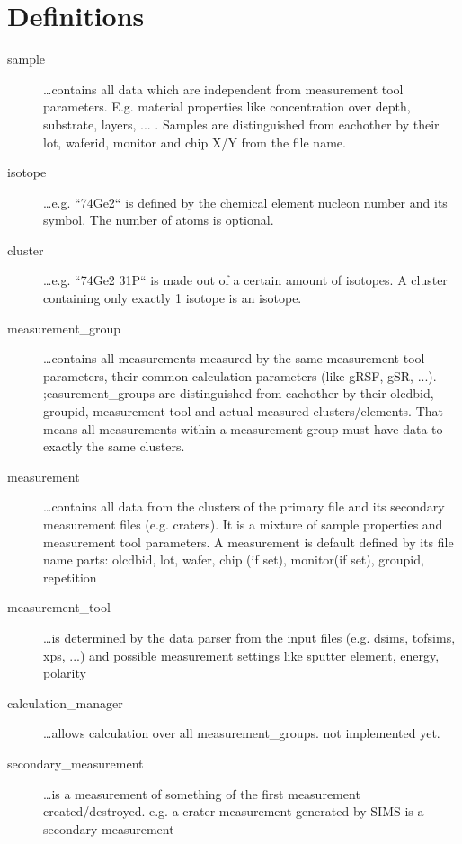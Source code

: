 \documentclass[a4paper,10pt]{article}
\begin{document}
\section{Definitions}
\begin{description}
\item[sample\label{sample}]{\ldots contains all data which are independent from measurement tool parameters. E.g. material properties like concentration over depth, substrate, layers, ... . Samples are distinguished from eachother by their lot, waferid, monitor and chip X/Y from the file name.}

\item[isotope\label{isotope}]{\ldots e.g. ``74Ge2`` is defined by the chemical element nucleon number and its symbol. The number of atoms is optional.}

\item[cluster\label{cluster}]{\ldots e.g. ``74Ge2 31P`` is made out of a certain amount of isotopes. A cluster containing only exactly 1 isotope is an isotope.}

\item[measurement\_group\label{measurement_group}]{\ldots contains all measurements measured by the same measurement tool parameters, their common calculation parameters (like gRSF, gSR, ...). ;easurement\_groups are distinguished from eachother by their olcdbid, groupid, measurement tool and actual measured clusters/elements. That means all measurements within a measurement group must have data to exactly the same clusters.}

\item[measurement\label{measurement}]{\ldots contains all data from the clusters of the primary file and its secondary measurement files (e.g. craters). It is a mixture of sample properties and measurement tool parameters. A measurement is default defined by its file name parts: olcdbid, lot, wafer, chip (if set), monitor(if set), groupid, repetition}

\item[measurement\_tool\label{measurement_tool}]{\ldots is determined by the data parser from the input files (e.g. dsims, tofsims, xps, ...) and possible measurement settings like sputter element, energy, polarity}

\item[calculation\_manager\label{calculation_manager}]{\ldots allows calculation over all measurement\_groups. not implemented yet.}

\item[secondary\_measurement\label{secondary_measurement}]{\ldots is a measurement of something of the first measurement created/destroyed. e.g. a crater measurement generated by SIMS is a secondary measurement}

\end{description}
\end{document}
